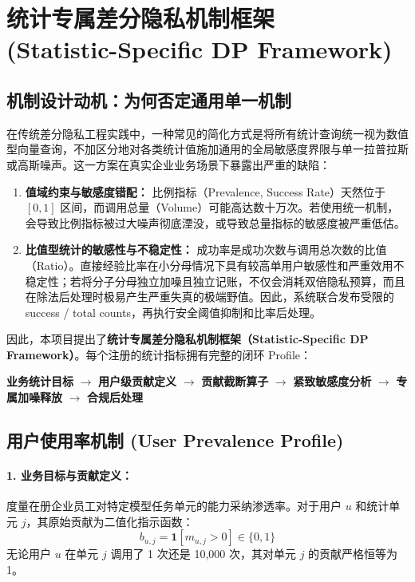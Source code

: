 \section[统计专属差分隐私机制框架]{统计专属差分隐私机制框架\\[0.2cm](Statistic-Specific DP Framework)}
\label{sec:dp_profiles}

\subsection{机制设计动机：为何否定通用单一机制}
在传统差分隐私工程实践中，一种常见的简化方式是将所有统计查询统一视为数值型向量查询，不加区分地对各类统计值施加通用的全局敏感度界限与单一拉普拉斯或高斯噪声。这一方案在真实企业业务场景下暴露出严重的缺陷：
\begin{enumerate}[label=(\arabic*), leftmargin=2em]
  \item \textbf{值域约束与敏感度错配：} 比例指标（Prevalence, Success Rate）天然位于 $[0, 1]$ 区间，而调用总量（Volume）可能高达数十万次。若使用统一机制，会导致比例指标被过大噪声彻底湮没，或导致总量指标的敏感度被严重低估。
  \item \textbf{比值型统计的敏感性与不稳定性：} 成功率是成功次数与调用总次数的比值（Ratio）。直接经验比率在小分母情况下具有较高单用户敏感性和严重效用不稳定性；若将分子分母独立加噪且独立记账，不仅会消耗双倍隐私预算，而且在除法后处理时极易产生严重失真的极端野值。因此，系统联合发布受限的 success / total counts，再执行安全阈值抑制和比率后处理。
\end{enumerate}

因此，本项目提出了\textbf{统计专属差分隐私机制框架（Statistic-Specific DP Framework）}。每个注册的统计指标拥有完整的闭环 Profile：
\begin{center}
  \textbf{业务统计目标} $\longrightarrow$ \textbf{用户级贡献定义} $\longrightarrow$ \textbf{贡献截断算子} $\longrightarrow$ \textbf{紧致敏感度分析} $\longrightarrow$ \textbf{专属加噪释放} $\longrightarrow$ \textbf{合规后处理}
\end{center}

\subsection{用户使用率机制 (User Prevalence Profile)}
\paragraph{1. 业务目标与贡献定义：}
度量在册企业员工对特定模型任务单元的能力采纳渗透率。对于用户 $u$ 和统计单元 $j$，其原始贡献为二值化指示函数：
\begin{equation}
  b_{u, j} = \mathbf{1}[m_{u, j} > 0] \in \{0, 1\}
\end{equation}
无论用户 $u$ 在单元 $j$ 调用了 1 次还是 10,000 次，其对单元 $j$ 的贡献严格恒等为 1。

